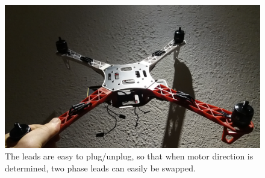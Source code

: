 \begin{figure}
\centering
\includegraphics[scale=0.1]{images/drone-build-esc-3phaseconnected.jpg}
\caption{The leads are easy to plug/unplug, so that when motor direction is determined, two phase leads can easily be swapped.}
\label{fig:frame}
\end{figure}

